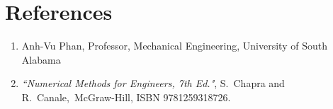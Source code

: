 \section{References}

\begin{enumerate}
\item  Anh-Vu Phan, Professor, Mechanical Engineering, University of
  South Alabama
\item {\it ``Numerical Methods for Engineers, 7th Ed."}, S.~Chapra and
  R.~Canale,~McGraw-Hill, ISBN 9781259318726.
\end{enumerate}
